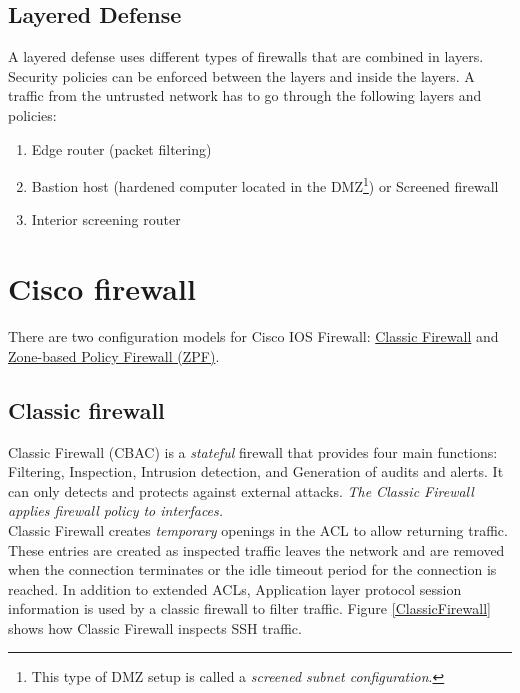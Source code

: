 \subsection{Layered Defense}

A layered defense uses different types of firewalls that are combined in layers. Security policies can be enforced between the layers and inside the layers. A traffic from the untrusted network has to go through the following layers and policies:

\begin{enumerate}
\item Edge router (packet filtering)
\item Bastion host (hardened computer located in the DMZ\footnote{This type of DMZ setup is called a \emph{screened subnet configuration}.}) or Screened firewall
\item Interior screening router
\end{enumerate}

\section{Cisco firewall}

There are two configuration models for Cisco IOS Firewall: \hyperref[sec:ClassicFirewall]{Classic Firewall} and \hyperref[sec:ZPF]{Zone-based Policy Firewall (ZPF)}.

\subsection{Classic firewall}\label{sec:ClassicFirewall}

Classic Firewall (CBAC) is a \emph{stateful} firewall that provides four main functions: Filtering, Inspection, Intrusion detection, and Generation of audits and alerts. It can only detects and protects against external attacks. \emph{The Classic Firewall applies firewall policy to interfaces.}\\ 

Classic Firewall creates \emph{temporary} openings in the ACL to allow returning traffic. These entries are created as inspected traffic leaves the network and are removed when the connection terminates or the idle timeout period for the connection is reached. 
In addition to extended ACLs, Application layer protocol session information is used by a classic firewall to filter traffic. Figure \ref{ClassicFirewall} shows how Classic Firewall inspects SSH traffic.

